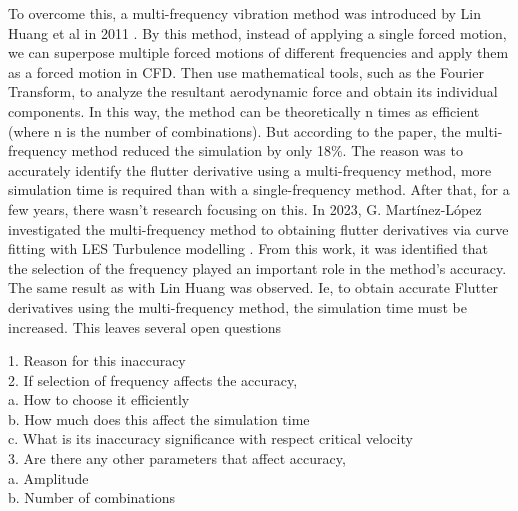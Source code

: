 \documentclass[../main]{subfiles}
\begin{document}
\vspace{0.5 cm}

To overcome this, a multi-frequency vibration method was introduced by Lin Huang et al in 2011 \cite{huang2011}. 
By this method, instead of applying a single forced motion, we can superpose multiple forced 
motions of different frequencies and apply them as a forced motion in CFD. Then use mathematical 
tools, such as the Fourier Transform, to analyze the resultant aerodynamic force and obtain its 
individual components. In this way, the method can be theoretically n times as efficient (where n 
is the number of combinations). But according to the paper, the multi-frequency method reduced 
the simulation by only 18\%. The reason was to accurately identify the flutter derivative using a 
multi-frequency method, more simulation time is required than with a single-frequency method. 
After that, for a few years, there wasn't research focusing on this. In 2023, G. Martínez-López 
investigated the multi-frequency method to obtaining flutter derivatives via curve fitting with LES 
Turbulence modelling \cite{Martínez-López_2023}. From this work, it was identified that the selection of the frequency played 
an important role in the method's accuracy. The same result as with Lin Huang was observed. Ie, 
to obtain accurate Flutter derivatives using the multi-frequency method, the simulation time must 
be increased. This leaves several open questions  


\begin{flushleft}
\hspace{2cm}1. Reason for this inaccuracy \\
\hspace{2cm}2. If selection of frequency affects the accuracy, \\
\hspace{3cm}a. How to choose it efficiently \\
\hspace{3cm}b. How much does this affect the simulation time \\
\hspace{3cm}c. What is its inaccuracy significance with respect critical velocity \\
\hspace{2cm}3. Are there any other parameters that affect accuracy, \\
\hspace{3cm}a. Amplitude \\
\hspace{3cm}b. Number of combinations
\end{flushleft}
\end{document}
